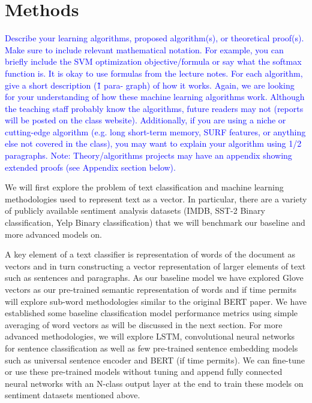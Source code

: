 \documentclass{article}
\newcommand{\note}[1]{\textcolor{blue}{{#1}}}
\begin{document}
\section{Methods}
\note{%
Describe your learning algorithms, proposed algorithm(s), or theoretical proof(s). Make sure to include relevant mathematical notation. For example, you can briefly include the SVM optimization objective/formula or say what the softmax function is. It is okay to use formulas from the lecture notes. For each algorithm, give a short description (\~ 1 para- graph) of how it works. Again, we are looking for your understanding of how these machine learning algorithms work. Although the teaching staff probably know the algorithms, future readers may not (reports will be posted on the class website). Additionally, if you are using a niche or cutting-edge algorithm (e.g. long short-term memory, SURF features, or anything else not covered in the class), you may want to explain your algorithm using 1/2 paragraphs. Note: Theory/algorithms projects may have an appendix showing extended proofs (see Appendix section below).
}

We will first explore the problem of text classification and machine learning methodologies used to represent text as a vector. In particular, there are a variety of publicly available sentiment analysis datasets (IMDB, SST-2 Binary classification, Yelp Binary classification) that we will benchmark our baseline and more advanced models on. 

A key element of a text classifier is representation of words of the document as vectors and in turn constructing a vector representation of larger elements of text such as sentences and paragraphs. As our baseline model we have explored Glove vectors as our pre-trained semantic representation of words and if time permits will explore sub-word methodologies similar to the original BERT paper. We have established some baseline classification model performance metrics using simple averaging of word vectors as will be discussed in the next section. For more advanced methodologies, we will explore LSTM, convolutional neural networks for sentence classification as well as few pre-trained sentence embedding models such as universal sentence encoder and BERT (if time permits). We can fine-tune or use these pre-trained models without tuning and append fully connected neural networks with an N-class output layer at the end to train these models on sentiment datasets mentioned above.
\end{document}
